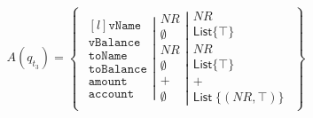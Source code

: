 \begin{align}
    A(q_{t_3})=\left\{\begin{matrix}
                          \left.\begin{matrix*}[l]
                                    \texttt{vName}\\
                                    \texttt{vBalance}\\
                                    \texttt{toName}\\
                                    \texttt{toBalance}\\
                                    \texttt{amount}\\
                                    \texttt{account}
                          \end{matrix*}\right|
                          \left.\begin{matrix}
                                    NR\\
                                    \emptyset\\
                                    NR\\
                                    \emptyset\\
                                    +\\
                                    \emptyset
                          \end{matrix}\right|
                          \begin{matrix}
                              NR\\
                              \mathsf{List} \{\top\}\\
                              NR\\
                              \mathsf{List} \{\top\}\\
                              +\\
                              \mathsf{List} \; \{(NR, \top)\}
                          \end{matrix}
    \end{matrix}\right\}
\end{align}

